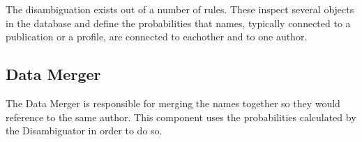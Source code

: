 The disambiguation exists out of a number of rules. These inspect several objects in the database and define the probabilities that names, typically connected to a publication or a profile, are connected to eachother and to one author. %

\subsection{Data Merger}

The Data Merger is responsible for merging the names together so they would reference to the same author. This component uses the probabilities calculated by the Disambiguator in order to do so.

%
%
%
%
%
%
%
%
%
%
%
